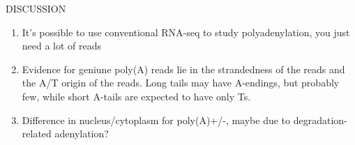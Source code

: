 \documentclass[a4paper]{article}
\begin{document}

DISCUSSION

\begin{enumerate}
	\item It's possible to use conventional RNA-seq to study polyadenylation,
		you just need a lot of reads
	\item Evidence for geniune poly(A) reads lie in the strandedness of the
		reads and the A/T origin of the reads. Long tails may have A-endings,
		but probably few, while short A-tails are expected to have only Ts.
	\item Difference in nucleus/cytoplasm for poly(A)+/-, maybe due to
		degradation-related adenylation? 

\end{enumerate}



%
\end{document}
